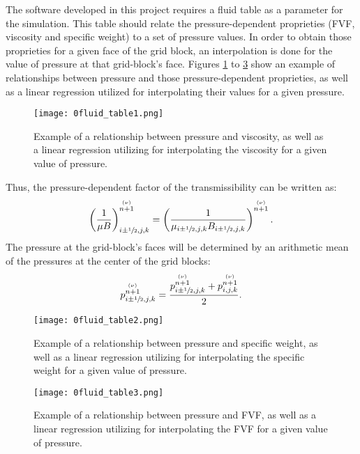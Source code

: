 The software developed in this project requires a fluid table as a parameter for the simulation. This table should relate the pressure-dependent proprieties (FVF, viscosity and specific weight) to a set of pressure values. In order to obtain those proprieties for a given face of the grid block, an interpolation is done for the value of pressure at that grid-block's face. Figures \ref{fig:0fluid_table1} to \ref{fig:0fluid_table3} show an example of relationships between pressure and those pressure-dependent proprieties, as well as a linear regression utilized for interpolating their values for a given pressure.
\begin{figure}[H]
	\centering
	\texttt{[image: 0fluid\_table1.png]}\\
	\caption{Example of a relationship between pressure and viscosity, as well as a linear regression utilizing for interpolating the viscosity for a given value of pressure.}
	\label{fig:0fluid_table1}
\end{figure}
Thus, the pressure-dependent factor of the transmissibility can be written as:
\begin{align}
\label{e2.24}
\left(\frac{1}{\mu B}\right)_{i\pm\sfrac{1}{2},j,k}^{\stackrel{(\nu)}{n+1}}=\left(\frac{1}{\mu_{i\pm\sfrac{1}{2},j,k} B_{i\pm\sfrac{1}{2},j,k}}\right)^{\stackrel{(\nu)}{n+1}}.
\end{align}
The pressure at the grid-block's faces will be determined by an arithmetic mean of the pressures at the center of the grid blocks:
\begin{align}
\label{e2.25}
p_{i\pm\sfrac{1}{2},j,k}^{\stackrel{(\nu)}{n+1}}=\frac{p^{\stackrel{(\nu)}{n+1}}_{i\pm\sfrac{1}{2},j,k}+p^{\stackrel{(\nu)}{n+1}}_{i,j,k}}{2}.
\end{align}
\begin{figure}[H]
	\centering
	\texttt{[image: 0fluid\_table2.png]}\\
	\caption{Example of a relationship between pressure and specific weight, as well as a linear regression utilizing for interpolating the specific weight for a given value of pressure.}
	\label{fig:0fluid_table2}
\end{figure}
\begin{figure}[H]
	\centering
	\texttt{[image: 0fluid\_table3.png]}\\
	\caption{Example of a relationship between pressure and FVF, as well as a linear regression utilizing for interpolating the FVF for a given value of pressure.}
	\label{fig:0fluid_table3}
\end{figure}
